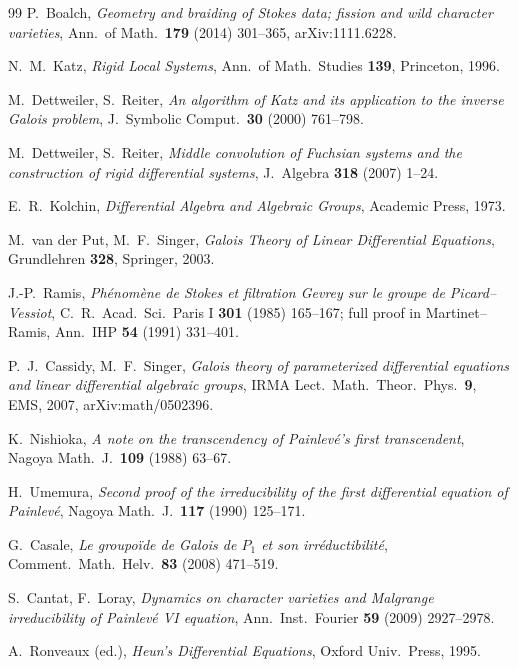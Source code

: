 \documentclass[11pt]{article}
\theoremstyle{definition}
\theoremstyle{remark}
\begin{document}
\begin{thebibliography}{99}
 P.~Boalch, \emph{Geometry and braiding of Stokes data; fission and wild
character varieties}, Ann.\ of Math.\ \textbf{179} (2014) 301--365, arXiv:1111.6228.

 N.~M.~Katz, \emph{Rigid Local Systems}, Ann.\ of Math.\ Studies
\textbf{139}, Princeton, 1996.

 M.~Dettweiler, S.~Reiter, \emph{An algorithm of Katz and its application to
the inverse Galois problem}, J.\ Symbolic Comput.\ \textbf{30} (2000) 761--798.

 M.~Dettweiler, S.~Reiter, \emph{Middle convolution of Fuchsian systems and
the construction of rigid differential systems}, J.\ Algebra \textbf{318} (2007) 1--24.

 E.~R.~Kolchin, \emph{Differential Algebra and Algebraic Groups},
Academic Press, 1973.

 M.~van der Put, M.~F.~Singer, \emph{Galois Theory of Linear Differential
Equations}, Grundlehren \textbf{328}, Springer, 2003.

 J.-P.~Ramis, \emph{Ph\'enom\`ene de Stokes et filtration Gevrey sur le
groupe de Picard--Vessiot}, C.\ R.\ Acad.\ Sci.\ Paris I \textbf{301} (1985) 165--167; full
proof in Martinet--Ramis, Ann.\ IHP \textbf{54} (1991) 331--401.

 P.~J.~Cassidy, M.~F.~Singer, \emph{Galois theory of parameterized
differential equations and linear differential algebraic groups}, IRMA Lect.\ Math.\ Theor.\
Phys.\ \textbf{9}, EMS, 2007, arXiv:math/0502396.

 K.~Nishioka, \emph{A note on the transcendency of Painlev\'e's first
transcendent}, Nagoya Math.\ J.\ \textbf{109} (1988) 63--67.

 H.~Umemura, \emph{Second proof of the irreducibility of the first
differential equation of Painlev\'e}, Nagoya Math.\ J.\ \textbf{117} (1990) 125--171.

 G.~Casale, \emph{Le groupo\"ide de Galois de $P_1$ et son
irr\'eductibilit\'e}, Comment.\ Math.\ Helv.\ \textbf{83} (2008) 471--519.

 S.~Cantat, F.~Loray, \emph{Dynamics on character varieties and Malgrange
irreducibility of Painlev\'e VI equation}, Ann.\ Inst.\ Fourier \textbf{59} (2009)
2927--2978.

 A.~Ronveaux (ed.), \emph{Heun's Differential Equations}, Oxford
Univ.\ Press, 1995.

\end{thebibliography}
\end{document}

